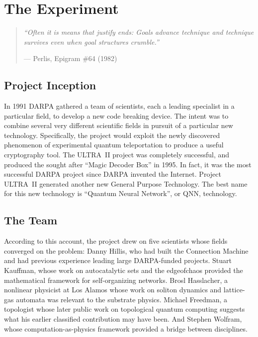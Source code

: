 
\chapter{The Experiment}
\label{pos11:the-experiment}

\begin{quote}\small\textit{%
``Often it is means that justify ends: Goals advance technique and technique survives even when goal structures crumble.''%
}\par\raggedleft --- Perlis, Epigram \#64 (1982)\end{quote}

\vspace{0.5cm}



\section*{Project Inception}
\label{pos11:project-inception}

In 1991 DARPA gathered a team of scientists, each a leading specialist in a particular field, to develop a new code breaking device.  The intent was to combine several very different scientific fields in pursuit of a particular new technology.  Specifically, the project would exploit the newly discovered phenomenon of experimental quantum teleportation to produce a useful cryptography tool. The ULTRA~II project was completely successful, and produced the sought after ``Magic Decoder Box'' in 1995.  In fact, it was the most successful DARPA project since DARPA invented the Internet. Project ULTRA~II generated another new General Purpose Technology.  The best name for this new technology is ``Quantum Neural Network'', or QNN, technology.

\section*{The Team}
\label{pos11:the-team}

According to this account, the project drew on five scientists whose fields converged on the problem: Danny Hillis, who had built the Connection Machine and had previous experience leading large DARPA-funded projects. Stuart Kauffman, whose work on autocatalytic sets and the \gls{edgeofchaos} provided the mathematical framework for self-organizing networks. Brosl Hasslacher, a nonlinear physicist at Los Alamos whose work on soliton dynamics and lattice-gas automata was relevant to the substrate physics. Michael Freedman, a topologist whose later public work on topological quantum computing suggests what his earlier classified contribution may have been. And Stephen Wolfram, whose computation-as-physics framework provided a bridge between disciplines.

